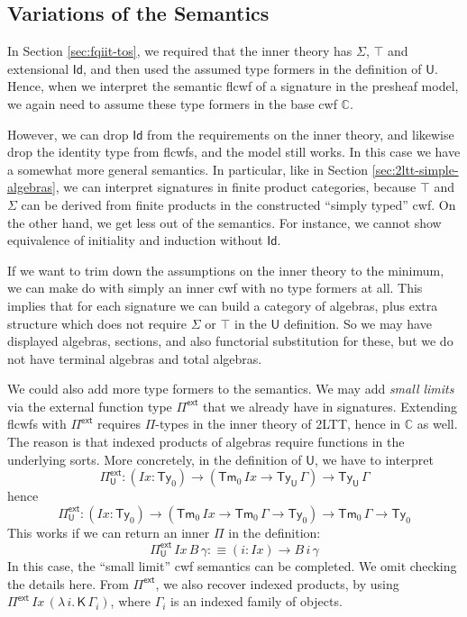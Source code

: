\documentclass[12pt,a4paper,twoside,openany]{book}
\theoremstyle{remark}
\theoremstyle{definition}
\theoremstyle{theorem}
\newcommand{\mi}[1]{\mathit{#1}}
\newcommand{\mbb}[1]{\mathbb{#1}}
\newcommand{\bs}[1]{\boldsymbol{#1}}
\newcommand{\Ix}{\mi{Ix}}
\newcommand{\Tm}{\mathsf{Tm}}
\newcommand{\Ty}{\mathsf{Ty}}
\newcommand{\U}{\mathsf{U}}
\newcommand{\Id}{\mathsf{Id}}
\newcommand{\Pie}{\Pi^{\mathsf{ext}}}
\newcommand{\K}{\mathsf{K}}
\newcommand{\bU}{\bs{\U}}
\newcommand{\mbbC}{\mbb{C}}
\newcommand{\defn}{:\equiv}
\begin{document}
\subsection{Variations of the Semantics}
\label{sec:fqii-variations}

In Section \ref{sec:fqiit-tos}, we required that the inner theory has $\Sigma$,
$\top$ and extensional $\Id$, and then used the assumed type formers in the
definition of $\bU$. Hence, when we interpret the semantic flcwf of a signature
in the presheaf model, we again need to assume these type formers in the base
cwf $\mbbC$.

However, we can drop $\Id$ from the requirements on the inner theory, and
likewise drop the identity type from flcwfs, and the model still works. In this
case we have a somewhat more general semantics. In particular, like in Section
\ref{sec:2ltt-simple-algebras}, we can interpret signatures in finite product
categories, because $\top$ and $\Sigma$ can be derived from finite products in
the constructed ``simply typed'' cwf. On the other hand, we get less out of the
semantics. For instance, we cannot show equivalence of initiality and induction
without $\Id$.

If we want to trim down the assumptions on the inner theory to the minimum, we
can make do with simply an inner cwf with no type formers at all. This
implies that for each signature we can build a category of algebras, plus extra
structure which does not require $\Sigma$ or $\top$ in the $\bU$ definition. So
we may have displayed algebras, sections, and also functorial substitution for
these, but we do not have terminal algebras and total algebras.

We could also add more type formers to the semantics. We may add \emph{small
  limits} via the external function type $\Pie$ that we already have in
signatures. Extending flcwfs with $\Pie$ requires $\Pi$-types in the inner
theory of 2LTT, hence in $\mbbC$ as well. The reason is that indexed products of
algebras require functions in the underlying sorts. More concretely, in the
definition of $\bU$, we have to interpret
\[
  \Pie_{\bU} : (\Ix : \Ty_0) \to (\Tm_0\,\Ix \to \Ty_{\bU}\,\Gamma) \to \Ty_{\bU}\,\Gamma
\]
hence
\[
  \Pie_{\bU} : (\Ix : \Ty_0) \to (\Tm_0\,\Ix \to \Tm_0\,\Gamma \to \Ty_0) \to \Tm_0\,\Gamma \to \Ty_0
\]
This works if we can return an inner $\Pi$ in the definition:
\[
  \Pie_{\bU}\,\Ix\,B\,\gamma \defn (i : \Ix) \to B\,i\,\gamma
\]
In this case, the ``small limit'' cwf semantics can be completed. We omit
checking the details here. From $\Pie$, we also recover indexed products, by
using $\Pie\,\Ix\,(\lambda\,i.\,\K\,\Gamma_i)$, where $\Gamma_i$ is an indexed
family of objects.
\end{document}
